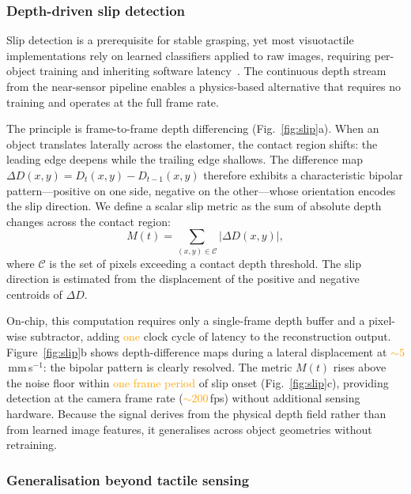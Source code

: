 \documentclass[10pt,a4paper]{article}
\newcommand{\placeholder}[1]{\textcolor{orange}{#1}}
\begin{document}
\subsubsection*{Depth-driven slip detection}

Slip detection is a prerequisite for stable grasping, yet most visuotactile implementations rely on learned classifiers applied to raw images, requiring per-object training and inheriting software latency~\cite{dong2017improved}. The continuous depth stream from the near-sensor pipeline enables a physics-based alternative that requires no training and operates at the full frame rate.

The principle is frame-to-frame depth differencing (Fig.~\ref{fig:slip}a). When an object translates laterally across the elastomer, the contact region shifts: the leading edge deepens while the trailing edge shallows. The difference map $\Delta D(x,y) = D_t(x,y) - D_{t-1}(x,y)$ therefore exhibits a characteristic bipolar pattern---positive on one side, negative on the other---whose orientation encodes the slip direction. We define a scalar slip metric as the sum of absolute depth changes across the contact region:
\begin{equation}
  M(t) = \sum_{(x,y) \in \mathcal{C}} |\Delta D(x,y)|,
\end{equation}
where $\mathcal{C}$ is the set of pixels exceeding a contact depth threshold. The slip direction is estimated from the displacement of the positive and negative centroids of $\Delta D$.

On-chip, this computation requires only a single-frame depth buffer and a pixel-wise subtractor, adding \placeholder{one} clock cycle of latency to the reconstruction output. Figure~\ref{fig:slip}b shows depth-difference maps during a lateral displacement at \placeholder{${\sim}5$}\,mm\,s$^{-1}$: the bipolar pattern is clearly resolved. The metric $M(t)$ rises above the noise floor within \placeholder{one frame period} of slip onset (Fig.~\ref{fig:slip}c), providing detection at the camera frame rate (\placeholder{${\sim}200$}\,fps) without additional sensing hardware. Because the signal derives from the physical depth field rather than from learned image features, it generalises across object geometries without retraining.

\subsubsection*{Generalisation beyond tactile sensing}
\end{document}
